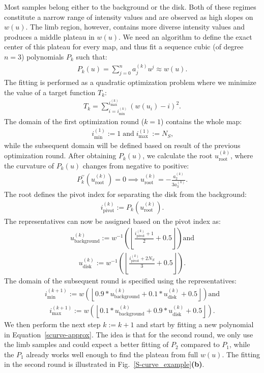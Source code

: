 \documentclass{aa}
\newcommand{\eqnl}[2]{\begin{eqnarray}\label{#1}#2\end{eqnarray}}
\newcommand{\floor}[1]{\left\lfloor #1 \right\rfloor}
\newcommand{\s}[2]{{#1}_{\mathrm{#2}}}
\begin{document}
  Most samples belong either to the background or the disk. Both of these regimes constitute a narrow range of intensity 
  values and are observed as high slopes on $w(u)$. The limb region, however, contains more diverse intensity values and 
  produces a middle plateau in $w(u)$. We need an algorithm to define the exact center of this plateau for every map, and
  thus fit a sequence cubic (of degree $n=3$) polynomials $P_k$ such that:
  \eqnl{scurve-approx}{
  P_k(u) = \sum \limits_{j=0}^{n} a_j^{(k)} u^j \approx w(u) \text{.}
  }
  The fitting is performed as a quadratic optimization problem where we minimize the value of a target function $T_k$:
  \eqnl{scurve-target}{
  T_k = \sum \limits_{i = \s{i}{min}^{(k)}}^{\s{i}{max}^{(k)}} \left( w(u_i) - i \right)^2 \text{.}
  }
  The domain of the first optimization round ($k=1$) contains the whole map:
  \eqnl{scurve-firstdomain}{
  \s{i}{min}^{(1)} := 1 \; \text{and} \; \s{i}{max}^{(1)} := N_S \text{,}
  }
  while the subsequent domain will be defined based on result of the previous optimization round. After obtaining 
  $P_k(u)$, we calculate the root $\s{u}{root}^{(k)}$, where the curvature of $P_k(u)$ changes from negative to 
  positive:
  \eqnl{scurve-root}{
  P_k^{\prime\prime}(\s{u}{root}^{(k)}) = 0 \implies \s{u}{root}^{(k)} = -\frac{a_2^{(k)}}{3 a_3^{(k)}} \text{.}
  }
  The root defines the pivot index for separating the disk from the background:
  \eqnl{scurve-pivot}{
  \s{i}{pivot}^{(k)} := P_k(\s{u}{root}^{(k)}) \text{.}
  }
  The representatives can now be assigned based on the pivot index as:
  \eqnl{scurve-background}{
  \s{u}{background}^{(k)} := w^{-1} \left( \floor{\frac{\s{i}{pivot}^{(k)} + 1}{2} + 0.5} \right) \text{and}
  }
  \eqnl{scurve-disk}{
  \s{u}{disk}^{(k)} := w^{-1} \left( \floor{\frac{\s{i}{pivot}^{(k)} + 2 N_S}{3} + 0.5} \right) \text{.}
  }
  The domain of the subsequent round is specified using the representatives:
  \eqnl{scurve-nextdomain-min}{
  \s{i}{min}^{(k+1)} := w \left( \floor{ 0.9 * \s{u}{background}^{(k)} + 0.1 * \s{u}{disk}^{(k)} + 0.5 } \right) \text{and}
  }
  \eqnl{scurve-nextdomain-max}{
  \s{i}{max}^{(k+1)} := w \left( \floor{ 0.1 * \s{u}{background}^{(k)} + 0.9 * \s{u}{disk}^{(k)} + 0.5 } \right) \text{.}
  }
  We then perform the next step $k := k+1$ and start by fitting a new polynomial in Equation~\ref{scurve-approx}. The 
  idea is that for the second round, we only use the limb samples and could expect a better fitting of $P_2$ compared to 
  $P_1$, while the $P_1$ already works well enough to find the plateau from full $w(u)$. The fitting in the second round is illustrated in Fig.~\ref{S-curve_example}{\bf(b)}.
\end{document}
